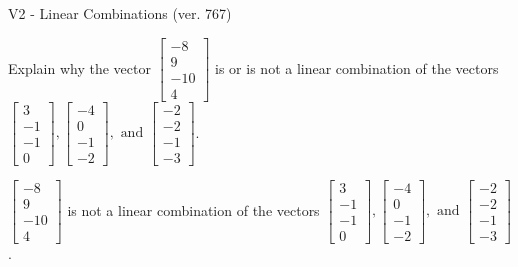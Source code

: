 \begin{exercise}
  \begin{exerciseTitle}V2 - Linear Combinations (ver. 767)\end{exerciseTitle}
  \begin{exerciseStatement}
    Explain why the vector \(\left[\begin{array}{c}
-8 \\
9 \\
-10 \\
4
\end{array}\right]\)  is or is not a linear 
	combination of the vectors \(\left[\begin{array}{c}
3 \\
-1 \\
-1 \\
0
\end{array}\right] , \left[\begin{array}{c}
-4 \\
0 \\
-1 \\
-2
\end{array}\right] , \text{ and } \left[\begin{array}{c}
-2 \\
-2 \\
-1 \\
-3
\end{array}\right]\).
	


  \end{exerciseStatement}
  \begin{exerciseAnswer}
   \(\left[\begin{array}{c}
-8 \\
9 \\
-10 \\
4
\end{array}\right]\) 
  	 is not  
	a linear combination of the vectors \(\left[\begin{array}{c}
3 \\
-1 \\
-1 \\
0
\end{array}\right] , \left[\begin{array}{c}
-4 \\
0 \\
-1 \\
-2
\end{array}\right] , \text{ and } \left[\begin{array}{c}
-2 \\
-2 \\
-1 \\
-3
\end{array}\right]\).

	
  


  \end{exerciseAnswer}
\end{exercise}
